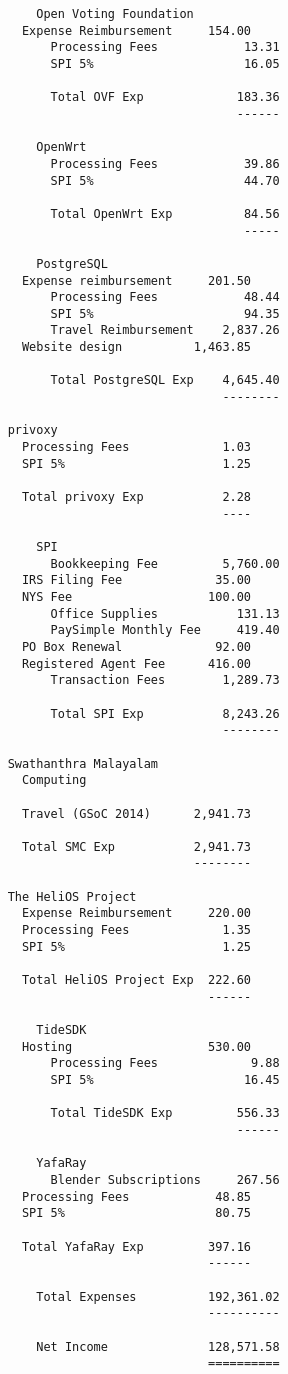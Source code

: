 \documentclass[letterpaper]{report}
\begin{document}
\begin{verbatim}
        Open Voting Foundation
	  Expense Reimbursement     154.00
          Processing Fees            13.31
          SPI 5%                     16.05

          Total OVF Exp             183.36
                                    ------

        OpenWrt
          Processing Fees            39.86
          SPI 5%                     44.70

          Total OpenWrt Exp          84.56
                                     -----

        PostgreSQL
	  Expense reimbursement     201.50
          Processing Fees            48.44
          SPI 5%                     94.35
          Travel Reimbursement    2,837.26
	  Website design          1,463.85

          Total PostgreSQL Exp    4,645.40
                                  --------

	privoxy
	  Processing Fees             1.03
	  SPI 5%                      1.25

	  Total privoxy Exp           2.28
	                              ----

        SPI
          Bookkeeping Fee         5,760.00
	  IRS Filing Fee             35.00
	  NYS Fee                   100.00
          Office Supplies           131.13
          PaySimple Monthly Fee     419.40
	  PO Box Renewal             92.00
	  Registered Agent Fee      416.00
          Transaction Fees        1,289.73

          Total SPI Exp           8,243.26
                                  --------

	Swathanthra Malayalam
	  Computing

	  Travel (GSoC 2014)      2,941.73

	  Total SMC Exp           2,941.73
	                          --------

	The HeliOS Project
	  Expense Reimbursement     220.00
	  Processing Fees             1.35
	  SPI 5%                      1.25

	  Total HeliOS Project Exp  222.60
	                            ------

        TideSDK
	  Hosting                   530.00
          Processing Fees             9.88
          SPI 5%                     16.45

          Total TideSDK Exp         556.33
                                    ------

        YafaRay
          Blender Subscriptions     267.56
	  Processing Fees            48.85
	  SPI 5%                     80.75

	  Total YafaRay Exp         397.16
	                            ------

        Total Expenses          192,361.02
                                ----------

        Net Income              128,571.58
                                ==========

\end{verbatim}
\end{document}
